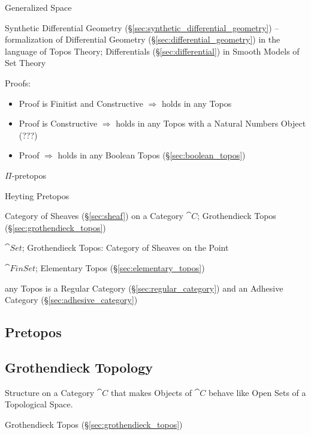 Generalized Space

\fist Synthetic Differential Geometry
(\S\ref{sec:synthetic_differential_geometry}) -- formalization of Differential
Geometry (\S\ref{sec:differential_geometry}) in the language of Topos Theory;
Differentials (\S\ref{sec:differential}) in Smooth Models of Set Theory

Proofs:
\begin{itemize}
  \item Proof is Finitist and Constructive $\Rightarrow$ holds in any Topos
  \item Proof is Constructive $\Rightarrow$ holds in any Topos with a Natural
    Numbers Object (???)
  \item Proof $\Rightarrow$ holds in any Boolean Topos
    (\S\ref{sec:boolean_topos})
\end{itemize}

$\Pi$-pretopos

Heyting Pretopos

Category of Sheaves (\S\ref{sec:sheaf}) on a Category $\cat{C}$; Grothendieck
Topos (\S\ref{sec:grothendieck_topos})

$\cat{Set}$; Grothendieck Topos: Category of Sheaves on the Point

$\cat{FinSet}$; Elementary Topos (\S\ref{sec:elementary_topos})

any Topos is a Regular Category (\S\ref{sec:regular_category}) and an Adhesive
Category (\S\ref{sec:adhesive_category})



\subsection{Pretopos}\label{sec:pretopos}

\subsection{Grothendieck Topology}\label{sec:grothendieck_topology}

Structure on a Category $\cat{C}$ that makes Objects of $\cat{C}$ behave like
Open Sets of a Topological Space.

Grothendieck Topos (\S\ref{sec:grothendieck_topos})

